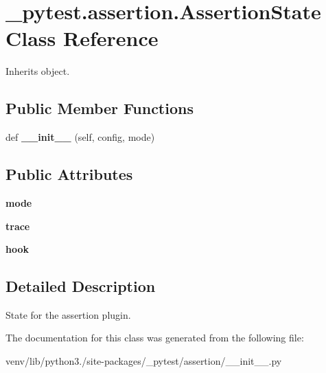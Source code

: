 \hypertarget{class__pytest_1_1assertion_1_1_assertion_state}{}\section{\+\_\+pytest.\+assertion.\+Assertion\+State Class Reference}
\label{class__pytest_1_1assertion_1_1_assertion_state}


Inherits object.

\subsection*{Public Member Functions}
\begin{DoxyCompactItemize}
\item 
\mbox{\label{class__pytest_1_1assertion_1_1_assertion_state_a06badd3b238d3ffd908c88aa6ee60f87}} 
def {\bfseries \+\_\+\+\_\+init\+\_\+\+\_\+} (self, config, mode)
\end{DoxyCompactItemize}
\subsection*{Public Attributes}
\begin{DoxyCompactItemize}
\item 
\mbox{\label{class__pytest_1_1assertion_1_1_assertion_state_ac87aa5b15c01d9a0ebbaa8267e2a9057}} 
{\bfseries mode}
\item 
\mbox{\label{class__pytest_1_1assertion_1_1_assertion_state_a975afffd81d576855988355cc3e14fb0}} 
{\bfseries trace}
\item 
\mbox{\label{class__pytest_1_1assertion_1_1_assertion_state_af3c6770a69dd6b56bd146b9fa33bbdb9}} 
{\bfseries hook}
\end{DoxyCompactItemize}


\subsection{Detailed Description}
\begin{DoxyVerb}State for the assertion plugin.\end{DoxyVerb}
 

The documentation for this class was generated from the following file\+:\begin{DoxyCompactItemize}
\item 
venv/lib/python3./site-\/packages/\+\_\+pytest/assertion/\+\_\+\+\_\+init\+\_\+\+\_\+.\+py\end{DoxyCompactItemize}
